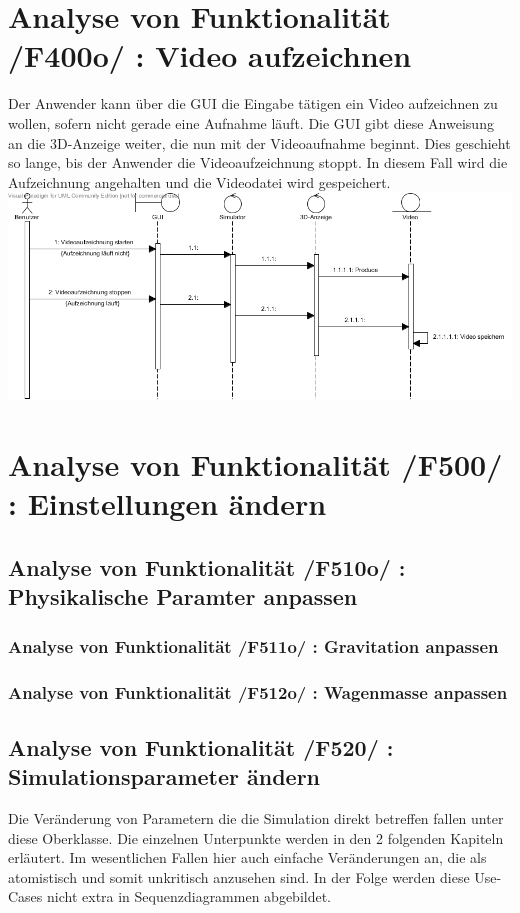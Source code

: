 \section{Analyse von Funktionalität /F400o/ :  Video aufzeichnen}
Der Anwender kann über die GUI die Eingabe tätigen ein Video aufzeichnen zu wollen, sofern nicht gerade eine Aufnahme läuft. Die GUI gibt diese Anweisung an die 3D-Anzeige weiter, die nun mit der
Videoaufnahme beginnt. Dies geschieht so lange, bis der Anwender die Videoaufzeichnung stoppt. In diesem Fall wird die Aufzeichnung angehalten und die Videodatei wird gespeichert.
\includegraphics[width=16cm]{bilder/Video_aufzeichnen}
\section{Analyse von Funktionalität /F500/ :  Einstellungen ändern}
\subsection{Analyse von Funktionalität /F510o/ :  Physikalische Paramter anpassen}
\subsubsection{Analyse von Funktionalität /F511o/ :  Gravitation anpassen}
\subsubsection{Analyse von Funktionalität /F512o/ :  Wagenmasse anpassen}
\subsection{Analyse von Funktionalität /F520/ :  Simulationsparameter ändern}
Die Veränderung von Parametern die die Simulation direkt betreffen fallen unter diese Oberklasse. Die einzelnen Unterpunkte werden in den 2 folgenden Kapiteln erläutert. Im wesentlichen Fallen hier 
auch einfache Veränderungen an, die als atomistisch und somit unkritisch anzusehen sind. In der Folge werden diese Use-Cases nicht extra in Sequenzdiagrammen abgebildet.
